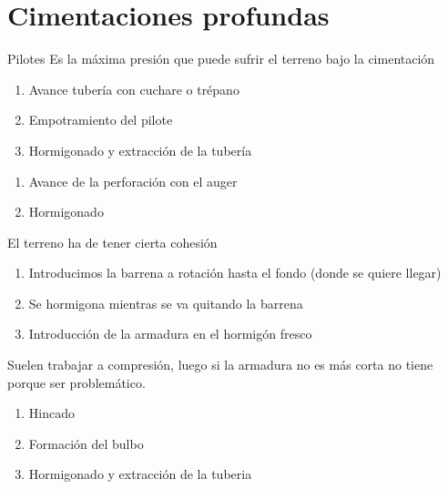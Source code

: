 \section{Cimentaciones profundas} %
\label{sec:cimentaciones_profundas}

\begin{mybox}{Pilotes}
Es la máxima presión que puede sufrir el terreno bajo la cimentación
	\begin{enumerate}
		\item Avance tubería con cuchare o trépano
		\item Empotramiento del pilote
		\item Hormigonado y extracción de la tubería
	\end{enumerate}
	\begin{enumerate}
		\item Avance de la perforación con el auger
		\item Hormigonado
	\end{enumerate}
	\begin{myrem}[Restricción]
		El terreno ha de tener cierta cohesión
	\end{myrem}
	\begin{enumerate}
		\item Introducimos la barrena a rotación hasta el fondo (donde se quiere llegar)
		\item Se hormigona mientras se va quitando la barrena
		\item Introducción de la armadura en el hormigón fresco
	\end{enumerate}
	\begin{myrem}[Armaduras]
		Suelen trabajar a compresión, luego si la armadura no es más corta no tiene porque ser problemático.
	\end{myrem}
	\begin{enumerate}
		\item Hincado
		\item Formación del bulbo
		\item Hormigonado y extracción de la tuberia
	\end{enumerate}
\end{mybox}

